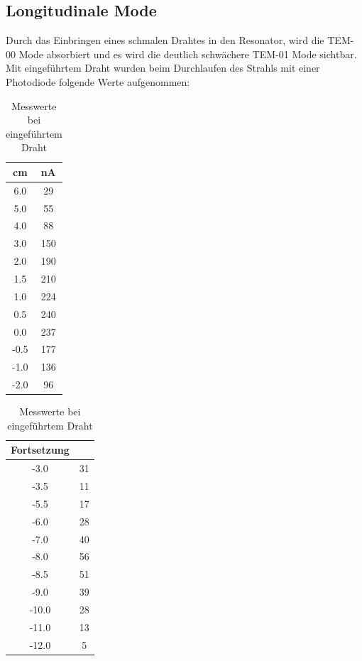 \subsection{Longitudinale Mode}
Durch das Einbringen eines schmalen Drahtes in den Resonator, wird die TEM-00 Mode absorbiert und es wird die deutlich schwächere TEM-01 Mode sichtbar. Mit eingeführtem Draht wurden beim Durchlaufen des Strahls mit einer Photodiode folgende Werte aufgenommen:

\begin{table}[H]

\begin{minipage}[t]{0.45\textwidth} 
\begin{tabular}[t]{c|c}
	cm & nA\\ \hline
6.0    & 29 \\
5.0    & 55\\
4.0    & 88\\
3.0    & 150\\
2.0    & 190\\
1.5    & 210\\
1.0    & 224\\
0.5    & 240\\
0.0    & 237\\
-0.5   & 177\\
-1.0   & 136\\
-2.0   & 96\\
\end{tabular}
\end{minipage}
\begin{minipage}[t]{0.45\textwidth} 
\begin{tabular}[t]{c|c}
Fortsetzung\\ \hline
-3.0   & 31\\
-3.5   & 11\\
-5.5   & 17\\
-6.0   & 28\\
-7.0   & 40\\
-8.0   & 56\\
-8.5   & 51\\
-9.0   & 39\\
-10.0  & 28\\
-11.0  & 13\\
-12.0  & 5
\end{tabular}
\end{minipage}
\caption{Messwerte bei eingeführtem Draht}
\end{table}

